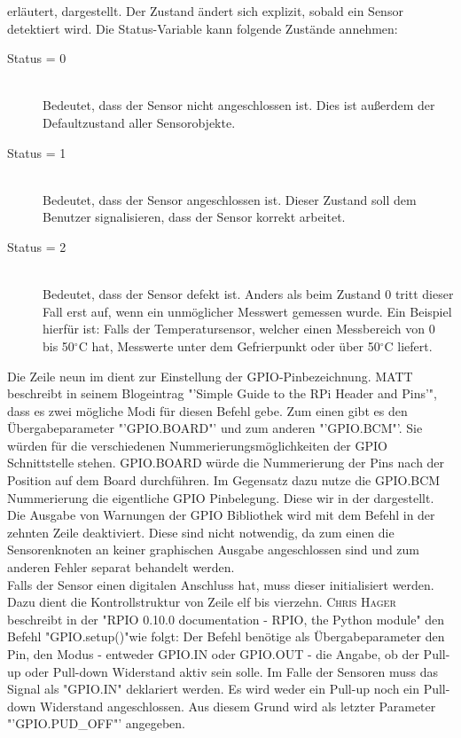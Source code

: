 	erläutert, dargestellt. Der Zustand ändert sich explizit, sobald ein Sensor detektiert wird. Die Status-Variable kann folgende Zustände annehmen:
	\begin{description}
		\item[Status = 0] \hfill \\
			Bedeutet, dass der Sensor nicht angeschlossen ist. Dies ist außerdem der Defaultzustand aller Sensorobjekte.
		\item[Status = 1] \hfill \\
			Bedeutet, dass der Sensor angeschlossen ist. Dieser Zustand soll dem Benutzer signalisieren, dass der Sensor korrekt arbeitet.
		\item[Status = 2] \hfill \\
			Bedeutet, dass der Sensor defekt ist. Anders als beim Zustand 0 tritt dieser Fall erst auf, wenn ein unmöglicher Messwert gemessen wurde. Ein Beispiel hierfür ist: Falls der Temperatursensor, welcher einen Messbereich von 0 bis 50$^\circ$C hat, Messwerte unter dem Gefrierpunkt oder über 50$^\circ$C liefert.
	\end{description}
	Die Zeile neun im  dient zur Einstellung der GPIO-Pinbezeichnung. \textsc{MATT} beschreibt in seinem Blogeintrag "'Simple Guide to the RPi Header and Pins'"\cite{SimpleGu6:online}, dass es zwei mögliche Modi für diesen Befehl gebe. Zum einen gibt es den Übergabeparameter "'GPIO.BOARD"' und zum anderen "'GPIO.BCM"'. Sie würden für die verschiedenen Nummerierungsmöglichkeiten der \ac{GPIO} Schnittstelle stehen. GPIO.BOARD würde die Nummerierung der Pins nach der Position auf dem Board durchführen. Im Gegensatz dazu nutze die GPIO.BCM Nummerierung die eigentliche GPIO Pinbelegung. Diese wir in der  dargestellt.\\
	Die Ausgabe von Warnungen der GPIO Bibliothek wird mit dem Befehl in der zehnten Zeile deaktiviert. Diese sind nicht notwendig, da zum einen die Sensorenknoten an keiner graphischen Ausgabe angeschlossen sind und zum anderen Fehler separat behandelt werden.\\
	Falls der Sensor einen digitalen Anschluss hat, muss dieser initialisiert werden. Dazu dient die Kontrollstruktur von Zeile elf bis vierzehn. \textsc{Chris Hager} beschreibt in der "RPIO 0.10.0 documentation - RPIO, the Python module" den Befehl "GPIO.setup()"\space wie folgt: Der Befehl benötige als Übergabeparameter den Pin, den Modus - entweder GPIO.IN oder GPIO.OUT - die Angabe, ob der Pull-up oder Pull-down Widerstand aktiv sein solle. Im Falle der Sensoren muss das Signal als "GPIO.IN" deklariert werden. Es wird weder ein Pull-up noch ein Pull-down Widerstand angeschlossen. Aus diesem Grund wird als letzter Parameter "'GPIO.PUD\_OFF"' angegeben. \\
